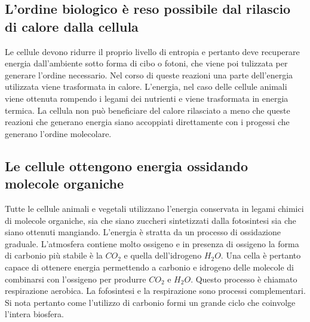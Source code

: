 \subsection{L'ordine biologico \`e reso possibile dal rilascio di calore dalla cellula}
Le cellule devono ridurre il proprio livello di entropia e pertanto deve recuperare energia dall'ambiente sotto forma di cibo o fotoni, che viene poi tulizzata per generare l'ordine
necessario. Nel corso di queste reazioni una parte dell'energia utilizzata viene trasformata in calore. L'energia, nel caso delle cellule animali viene ottenuta rompendo i legami dei 
nutrienti e viene trasformata in energia termica. La cellula non pu\`o beneficiare del calore rilasciato a meno che queste reazioni che generano energia siano accoppiati direttamente
con i progessi che generano l'ordine molecolare. 
\subsection{Le cellule ottengono energia ossidando molecole organiche}
Tutte le cellule animali e vegetali utilizzano l'energia conservata in legami chimici di molecole organiche, sia che siano zuccheri sintetizzati dalla fotosintesi sia che siano ottenuti
mangiando. L'energia \`e stratta da un processo di ossidazione graduale. L'atmosfera contiene molto ossigeno e in presenza di ossigeno la forma di carbonio pi\`u stabile \`e la $CO_2$ e
quella dell'idrogeno $H_2O$. Una cella \`e pertanto capace di ottenere energia permettendo a carbonio e idrogeno delle molecole di combinarsi con l'ossigeno per produrre $CO_2$ e $H_2O$.
Questo processo \`e chiamato respirazione aerobica. La fofosintesi e la respirazione sono processi complementari. Si nota pertanto come l'utilizzo di carbonio formi un grande ciclo che
coinvolge l'intera biosfera. 
